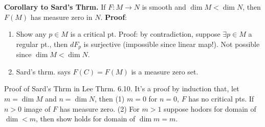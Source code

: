 \documentclass[12pt,letterpaper]{article}
\begin{document}
\textbf{Corollary to Sard's Thrm.} If $F: M \rightarrow N$ is smooth and $\dim M < \dim N$, then $F(M)$ has measure zero in $N$. \textbf{Proof}: 
\begin{enumerate}
    \item Show any $p \in M$ is a critical pt. Proof: by contradiction, suppose $\exists p \in M$ a regular pt., then $dF_p$ is surjective (impossible since linear map!). Not possible since $\dim M < \dim N$. 
    \item Sard's thrm. says $F(C) = F(M)$ is a measure zero set. 
\end{enumerate}
Proof of Sard's Thrm in Lee Thrm. 6.10. It's a proof by induction that, let $m = \dim M$ and $n = \dim N$, then (1) $m=0$ for $n=0$, $F$ has no critical pts. If $n>0$ image of $F$ has measure zero. (2) For $m>1$ suppose hodors for domain of $\dim < m$, then show holds for domain of $\dim m =m$.
\end{document}

